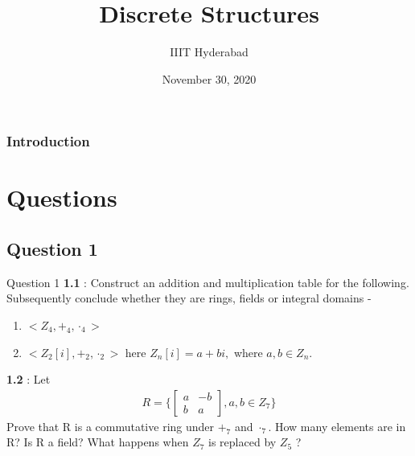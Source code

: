 \documentclass[xcolor=svgnames]{beamer}
\title[Discrete Structures]{Discrete Structures} %
\author{IIIT Hyderabad} %
\institute[] %
{
Monsoon 2020 \\ %
\medskip
\textit{Tutorial 20} %
}
\date{November 30, 2020} %
\begin{document}
\begin{frame}
\titlepage %
\end{frame}

\begin{frame}
\frametitle{Introduction} %
\tableofcontents %
\end{frame}


\section{Questions}

\subsection{Question 1}
\begin{frame}{Question 1}
    \textbf{1.1} : Construct an addition and multiplication table for the following. Subsequently conclude whether they are rings, fields or integral domains - 
    \begin{enumerate}
        \item $<Z_4, +_4, \cdot_4>$
        \item $<Z_2[i], +_2, \cdot _2>$ here $Z_n[i] = a + bi,$ where $a,b \in Z_n$.
    \end{enumerate}
    \textbf{1.2} :  Let 
    \begin{align*}
        R = \bigg\{ \begin{bmatrix}
        a  & -b
        \\ b & a
        \end{bmatrix} , a,b \in Z_7\bigg\}
    \end{align*}
     Prove that R is a commutative ring under $+_7$ and $\cdot_7$. How  many  elements  are  in  R?  Is  R  a  field?  What  happens  when $Z_7$ is replaced by $Z_5$ ?
\end{frame}
\end{document}
